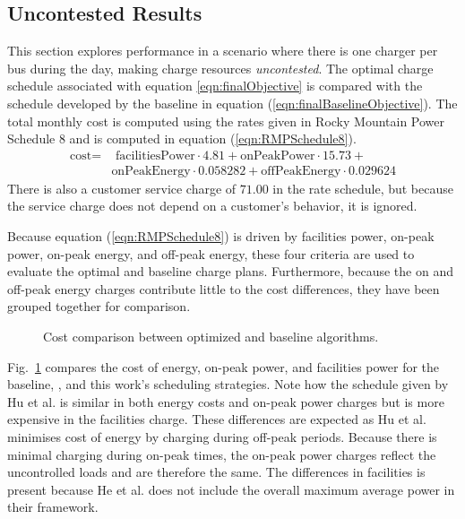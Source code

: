 \subsection{Uncontested Results}
This section explores performance in a scenario where there is one charger per bus during the day, making charge resources \textit{uncontested}. The optimal charge schedule associated with equation \ref{eqn:finalObjective} is compared with the schedule developed by the baseline in equation (\ref{eqn:finalBaselineObjective}). The total monthly cost is computed using the rates given in Rocky Mountain Power Schedule 8 and is computed in equation (\ref{eqn:RMPSchedule8}).
	\begin{equation}\label{eqn:RMPSchedule8}
		\begin{aligned}
			\text{cost} = & \text{ facilitiesPower}\cdot 4.81 + \text{onPeakPower}\cdot 15.73 + \\ 
			& \text{onPeakEnergy}\cdot 0.058282 + \text{offPeakEnergy}\cdot 0.029624
		\end{aligned}
	\end{equation}
	There is also a customer service charge of $71.00$ in the rate schedule, but because the service charge does not depend on a customer's behavior, it is ignored.
\par Because equation (\ref{eqn:RMPSchedule8}) is driven by facilities power, on-peak power, on-peak energy, and off-peak energy, these four criteria are used to evaluate the optimal and baseline charge plans.  Furthermore, because the on and off-peak energy charges contribute little to the cost differences, they have been grouped together for comparison.
\begin{figure}
	\centering
	\caption{Cost comparison between optimized and baseline algorithms.}
	\label{fig:costComparison}
\end{figure}
	\par  Fig.~\ref{fig:costComparison} compares the cost of energy, on-peak power, and facilities power for the baseline, \cite{He_2022_Battery}, and this work's scheduling strategies. Note how the schedule given by Hu et al. is similar in both energy costs and on-peak power charges but is more expensive in the facilities charge. These differences are expected as Hu et al. minimises cost of energy by charging during off-peak periods. Because there is minimal charging during on-peak times, the on-peak power charges reflect the uncontrolled loads and are therefore the same. The differences in facilities is present because He et al. does not include the overall maximum average power in their framework. 

